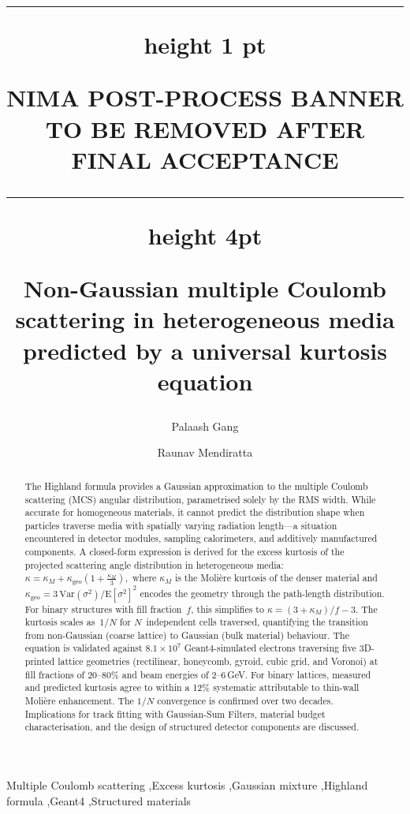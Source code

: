 \documentclass[final,5p,times,twocolumn]{elsarticle}
\def\pmbanner{{\hrule height 1 pt}\vskip35pt{NIMA POST-PROCESS BANNER TO BE REMOVED AFTER FINAL ACCEPTANCE}\vskip35pt{\hrule height 4pt}\vskip20pt}
\begin{document}
\begin{frontmatter}

\title{\pmbanner Non-Gaussian multiple Coulomb scattering in heterogeneous media predicted by a universal kurtosis equation}

\author[1]{Palaash Gang}

\author[2]{Raunav Mendiratta}



\begin{abstract}
The Highland formula provides a Gaussian approximation to the multiple Coulomb scattering (MCS) angular distribution, parametrised solely by the RMS width.  While accurate for homogeneous materials, it cannot predict the distribution shape when particles traverse media with spatially varying radiation length---a situation encountered in detector modules, sampling calorimeters, and additively manufactured components.  A closed-form expression is derived for the excess kurtosis of the projected scattering angle distribution in heterogeneous media: $ \kappa = \kappa_M + \kappa_{\mathrm{geo}}\!\left(1+\frac{\kappa_M}{3}\right),$ where $\kappa_M$ is the Moli\`{e}re kurtosis of the denser material and $\kappa_{\mathrm{geo}} = 3\,\mathrm{Var}(\sigma^2)/\mathrm{E}[\sigma^2]^2$ encodes the geometry through the path-length distribution.  For binary structures with fill fraction~$f$, this simplifies to $\kappa = (3+\kappa_M)/f - 3$.  The kurtosis scales as~$1/N$ for $N$~independent cells traversed, quantifying the transition from non-Gaussian (coarse lattice) to Gaussian (bulk material) behaviour.  The equation is validated against $8.1\times10^{7}$ Geant4-simulated electrons traversing five 3D-printed lattice geometries (rectilinear, honeycomb, gyroid, cubic grid, and Voronoi) at fill fractions of 20--80\% and beam energies of 2--6\,GeV.  For binary lattices, measured and predicted kurtosis agree to within a 12\% systematic attributable to thin-wall Moli\`{e}re enhancement.  The $1/N$ convergence is confirmed over two decades.  Implications for track fitting with Gaussian-Sum Filters, material budget characterisation, and the design of structured detector components are discussed.
\end{abstract}

\begin{keyword}
Multiple Coulomb scattering \sep Excess kurtosis \sep Gaussian mixture \sep Highland formula \sep Geant4 \sep Structured materials
\end{keyword}


\end{frontmatter}
\end{document}
